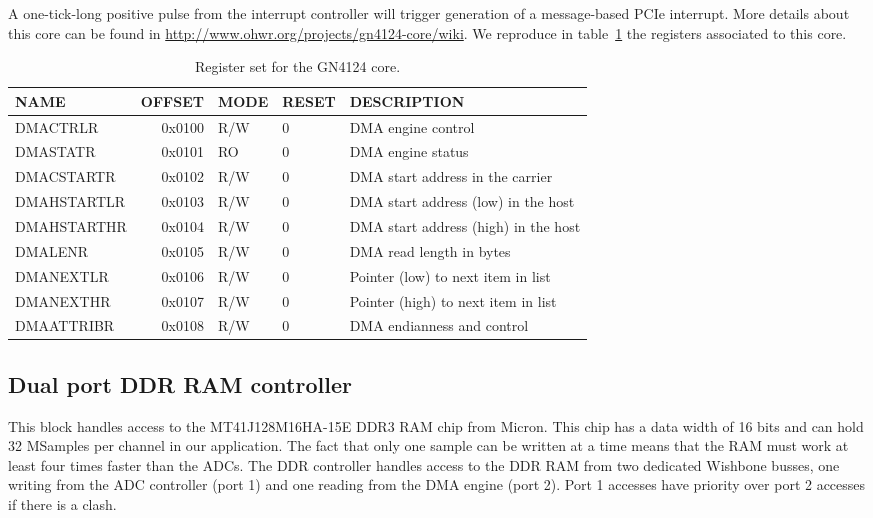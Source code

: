 \documentclass[a4paper]{article}
\begin{document}
A one-tick-long positive pulse from the interrupt controller will trigger generation of a message-based PCIe interrupt. More details about this core can be found in \href{http://www.ohwr.org/projects/gn4124-core/wiki}{http://www.ohwr.org/projects/gn4124-core/wiki}. We reproduce in table~\ref{tab:gn4124_core} the registers associated to this core. 

\begin{table}[htbp]
  \centering
  \begin{tabularx}{\textwidth}{|l|r|l|l|X|}
    \hline
    \textbf{NAME} & \textbf{OFFSET} & \textbf{MODE} & \textbf{RESET} & \textbf{DESCRIPTION} \\
    \hline
    \hline
    DMACTRLR & 0x0100 & R/W & 0 & DMA engine control\\
    \hline
    DMASTATR & 0x0101 & RO & 0 & DMA engine status\\
    \hline
    DMACSTARTR & 0x0102 & R/W & 0 & DMA start address in the carrier\\
    \hline
    DMAHSTARTLR & 0x0103 & R/W & 0 & DMA start address (low) in the host\\
    \hline
    DMAHSTARTHR & 0x0104 & R/W & 0 & DMA start address (high) in the host\\
    \hline
    DMALENR & 0x0105 & R/W & 0 & DMA read length in bytes\\
    \hline
    DMANEXTLR & 0x0106 & R/W & 0 & Pointer (low) to next item in list\\
    \hline
    DMANEXTHR & 0x0107 & R/W & 0 & Pointer (high) to next item in list\\
    \hline
    DMAATTRIBR & 0x0108 & R/W & 0 & DMA endianness and control\\
    \hline
  \end{tabularx}
  \caption{Register set for the GN4124 core.}
  \label{tab:gn4124_core}
\end{table}

\subsection{Dual port DDR RAM controller}
This block handles access to the MT41J128M16HA-15E DDR3 RAM chip from Micron. This chip has a data width of 16 bits and can hold 32 MSamples per channel in our application. The fact that only one sample can be written at a time means that the RAM must work at least four times faster than the ADCs. The DDR controller handles access to the DDR RAM from two dedicated Wishbone busses, one writing from the ADC controller (port 1) and one reading from the DMA engine (port 2). Port 1 accesses have priority over port 2 accesses if there is a clash.
\end{document}

